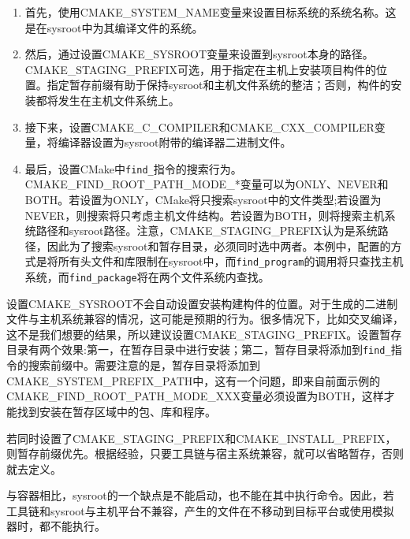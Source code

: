 \begin{enumerate}
\item 
首先，使用CMAKE\_SYSTEM\_NAME变量来设置目标系统的系统名称。这是在sysroot中为其编译文件的系统。

\item 
然后，通过设置CMAKE\_SYSROOT变量来设置到sysroot本身的路径。CMAKE\_STAGING\_PREFIX可选，用于指定在主机上安装项目构件的位置。指定暂存前缀有助于保持sysroot和主机文件系统的整洁；否则，构件的安装都将发生在主机文件系统上。

\item 
接下来，设置CMAKE\_C\_COMPILER和CMAKE\_CXX\_COMPILER变量，将编译器设置为sysroot附带的编译器二进制文件。

\item 
最后，设置CMake中\texttt{find\_}指令的搜索行为。CMAKE\_FIND\_ROOT\_PATH\_MODE\_*变量可以为ONLY、NEVER和BOTH。若设置为ONLY，CMake将只搜索sysroot中的文件类型;若设置为NEVER，则搜索将只考虑主机文件结构。若设置为BOTH，则将搜索主机系统路径和sysroot路径。注意，CMAKE\_STAGING\_PREFIX认为是系统路径，因此为了搜索sysroot和暂存目录，必须同时选中两者。本例中，配置的方式是将所有头文件和库限制在sysroot中，而\texttt{find\_program}的调用将只查找主机系统，而\texttt{find\_package}将在两个文件系统内查找。
\end{enumerate}

设置CMAKE\_SYSROOT不会自动设置安装构建构件的位置。对于生成的二进制文件与主机系统兼容的情况，这可能是预期的行为。很多情况下，比如交叉编译，这不是我们想要的结果，所以建议设置CMAKE\_STAGING\_PREFIX。设置暂存目录有两个效果:第一，在暂存目录中进行安装；第二，暂存目录将添加到\texttt{find\_}指令的搜索前缀中。需要注意的是，暂存目录将添加到CMAKE\_SYSTEM\_PREFIX\_PATH中，这有一个问题，即来自前面示例的CMAKE\_FIND\_ROOT\_PATH\_MODE\_XXX变量必须设置为BOTH，这样才能找到安装在暂存区域中的包、库和程序。

\begin{tcolorbox}[colback=blue!5!white,colframe=blue!75!black,title=CMAKE\_STAGING\_PREFIX和CMAKE\_INSTALL\_PREFIX]
若同时设置了CMAKE\_STAGING\_PREFIX和CMAKE\_INSTALL\_PREFIX，则暂存前缀优先。根据经验，只要工具链与宿主系统兼容，就可以省略暂存，否则就去定义。
\end{tcolorbox}

与容器相比，sysroot的一个缺点是不能启动，也不能在其中执行命令。因此，若工具链和sysroot与主机平台不兼容，产生的文件在不移动到目标平台或使用模拟器时，都不能执行。





























